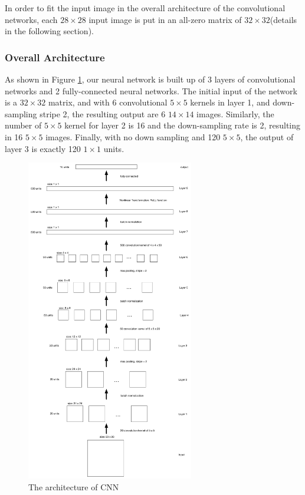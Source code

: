 \documentclass[12pt]{article}
\begin{document}
In order to fit the input image in the overall architecture of the convolutional networks, each $28\times 28$ input image is put in an all-zero matrix of $32\times 32$(details in the following section).

\subsubsection{Overall Architecture}

As shown in Figure \ref{fig:arch}, our neural network is built up of 3 layers of convolutional networks and 2 fully-connected neural networks. The initial input of the network is a $32\times 32$ matrix, and with 6 convolutional $5\times 5$ kernels in layer 1, and down-sampling stripe 2, the resulting output are 6 $14\times 14$ images. Similarly, the number of $5\times 5$ kernel for layer 2 is 16 and the down-sampling rate is 2, resulting in 16 $5\times 5$ images. Finally, with no down sampling and 120 $5\times 5$, the output of layer 3 is exactly 120 $1\times 1$ units.

\begin{figure}[tbp]
	\centering
	\includegraphics[width =0.65\textwidth]{cnn_arch}		
	\caption{The architecture of CNN}
	\label{fig:arch}
\end{figure}
\end{document}
